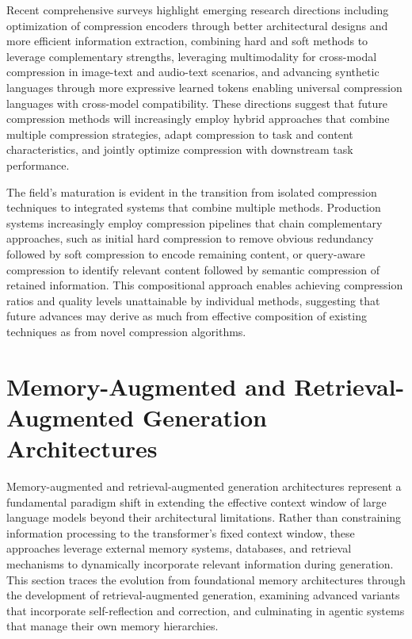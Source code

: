 Recent comprehensive surveys \citep{li2025prompt} highlight emerging research directions including optimization of compression encoders through better architectural designs and more efficient information extraction, combining hard and soft methods to leverage complementary strengths, leveraging multimodality for cross-modal compression in image-text and audio-text scenarios, and advancing synthetic languages through more expressive learned tokens enabling universal compression languages with cross-model compatibility. These directions suggest that future compression methods will increasingly employ hybrid approaches that combine multiple compression strategies, adapt compression to task and content characteristics, and jointly optimize compression with downstream task performance.

The field's maturation is evident in the transition from isolated compression techniques to integrated systems that combine multiple methods. Production systems increasingly employ compression pipelines that chain complementary approaches, such as initial hard compression to remove obvious redundancy followed by soft compression to encode remaining content, or query-aware compression to identify relevant content followed by semantic compression of retained information. This compositional approach enables achieving compression ratios and quality levels unattainable by individual methods, suggesting that future advances may derive as much from effective composition of existing techniques as from novel compression algorithms.
\section{Memory-Augmented and Retrieval-Augmented Generation Architectures}
\label{sec:memoryaugmented}

Memory-augmented and retrieval-augmented generation architectures represent a fundamental paradigm shift in extending the effective context window of large language models beyond their architectural limitations. Rather than constraining information processing to the transformer's fixed context window, these approaches leverage external memory systems, databases, and retrieval mechanisms to dynamically incorporate relevant information during generation. This section traces the evolution from foundational memory architectures through the development of retrieval-augmented generation, examining advanced variants that incorporate self-reflection and correction, and culminating in agentic systems that manage their own memory hierarchies.

